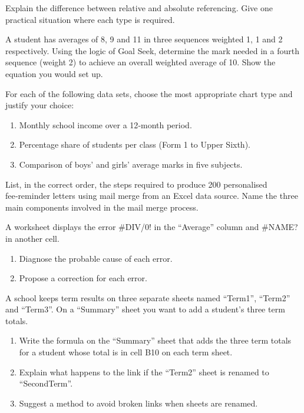 \documentclass[11pt]{article}
\newcounter{popsec}
\newcounter{popsub}
\newcommand{\courssub}[1]{%
  \stepcounter{popsub}%
  \par\vspace{9pt}\noindent{\popxbold\fontsize{11.5}{13}\selectfont\color{popink}{\color{poporange}\thepopsec.\thepopsub}\hspace{6pt}#1}\par\nopagebreak\vspace{4pt}
}
\begin{document}
\begin{exercice}
Explain the difference between relative and absolute referencing. Give one practical situation where each type is required.
\end{exercice}

\begin{exercice}
A student has averages of 8, 9 and 11 in three sequences weighted 1, 1 and 2 respectively. Using the logic of Goal Seek, determine the mark needed in a fourth sequence (weight 2) to achieve an overall weighted average of 10. Show the equation you would set up.
\end{exercice}

\begin{exercice}
For each of the following data sets, choose the most appropriate chart type and justify your choice:
\begin{enumerate}
\item Monthly school income over a 12‑month period.
\item Percentage share of students per class (Form 1 to Upper Sixth).
\item Comparison of boys' and girls' average marks in five subjects.
\end{enumerate}
\end{exercice}

\courssub{I prepare for the GCE}
\begin{exercice}
List, in the correct order, the steps required to produce 200 personalised fee‑reminder letters using mail merge from an Excel data source. Name the three main components involved in the mail merge process.
\end{exercice}

\begin{exercice}
A worksheet displays the error \#DIV/0! in the ``Average'' column and \#NAME? in another cell.
\begin{enumerate}
\item Diagnose the probable cause of each error.
\item Propose a correction for each error.
\end{enumerate}
\end{exercice}

\begin{exercice}
A school keeps term results on three separate sheets named ``Term1'', ``Term2'' and ``Term3''. On a ``Summary'' sheet you want to add a student's three term totals.
\begin{enumerate}
\item Write the formula on the ``Summary'' sheet that adds the three term totals for a student whose total is in cell B10 on each term sheet.
\item Explain what happens to the link if the ``Term2'' sheet is renamed to ``SecondTerm''.
\item Suggest a method to avoid broken links when sheets are renamed.
\end{enumerate}
\end{exercice}
\end{document}
